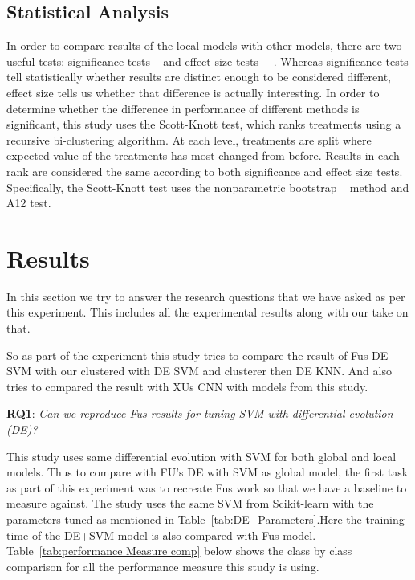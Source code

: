 \documentclass[sigconf]{acmart}
\theoremstyle{break}
\begin{document}
    \subsection{Statistical Analysis}
    \label{sssec:Statistical Analysis}
    In order to compare results of the local models with other models, there are two useful tests: significance tests ~\cite{bentler1980significance} and effect size tests ~\cite{rosenthal1994parametric}~\cite{chen2002correlation}. Whereas significance tests tell statistically whether results are distinct enough to be considered different, effect size tells us whether that difference is actually interesting. In order to determine whether the difference in performance of different methods is significant, this study uses the Scott-Knott test, which ranks treatments using a recursive bi-clustering algorithm. At each level, treatments are split where expected value of the treatments has most changed from before. Results in each rank are considered the same according to both significance and effect size tests. Specifically, the Scott-Knott test uses the nonparametric bootstrap ~\cite{efron1982jackknife} method and A12 test.
    

\section{Results}
\label{sect:Result}
    In this section we try to answer the research questions that we have asked as per this experiment. This includes all the experimental results along with our take on that. 
    
    So as part of the experiment this study tries to compare the result of Fu\textquotesingle s DE SVM with our clustered with DE SVM  and clusterer then DE KNN. And also tries to compared the result with XU\textquotesingle s CNN with models from this study. 
    
    \textbf{RQ1}:  {\em Can we reproduce Fu\textquotesingle s results for tuning SVM with differential evolution (DE)?}
    
    This study uses same differential evolution with SVM for both global and local models. Thus to compare with FU's DE with SVM as global model, the first task as part of this experiment was to recreate Fu\textquotesingle s work so that we have a baseline to measure against. The study uses the same SVM from Scikit-learn with the parameters tuned as mentioned in Table~\ref{tab:DE_Parameters}.Here the training time of the DE+SVM model is also compared with Fu\textquotesingle s model. Table~\ref{tab:performance Measure comp} below shows the class by class comparison for all the performance measure this study is using.
    
\end{document}
